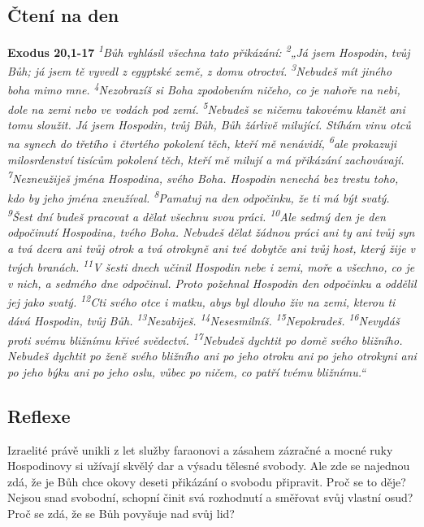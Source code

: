 \documentclass[11pt]{article}
\begin{document}
\subsection*{Čtení na den}
\textbf{Exodus 20,1-17}
\newline
\textit{
\textsuperscript{1}Bůh vyhlásil všechna tato přikázání:
\textsuperscript{2}„Já jsem Hospodin, tvůj Bůh; já jsem tě vyvedl z egyptské země, z domu otroctví.
\textsuperscript{3}Nebudeš mít jiného boha mimo mne.
\textsuperscript{4}Nezobrazíš si Boha zpodobením ničeho, co je nahoře na nebi, dole na zemi nebo ve vodách pod zemí.
\textsuperscript{5}Nebudeš se ničemu takovému klanět ani tomu sloužit. Já jsem Hospodin, tvůj Bůh, Bůh žárlivě milující. Stíhám vinu otců na synech do třetího i čtvrtého pokolení těch, kteří mě nenávidí,
\textsuperscript{6}ale prokazuji milosrdenství tisícům pokolení těch, kteří mě milují a má přikázání zachovávají.
\textsuperscript{7}Nezneužiješ jména Hospodina, svého Boha. Hospodin nenechá bez trestu toho, kdo by jeho jména zneužíval.
\textsuperscript{8}Pamatuj na den odpočinku, že ti má být svatý.
\textsuperscript{9}Šest dní budeš pracovat a dělat všechnu svou práci.
\textsuperscript{10}Ale sedmý den je den odpočinutí Hospodina, tvého Boha. Nebudeš dělat žádnou práci ani ty ani tvůj syn a tvá dcera ani tvůj otrok a tvá otrokyně ani tvé dobytče ani tvůj host, který žije v tvých branách.
\textsuperscript{11}V šesti dnech učinil Hospodin nebe i zemi, moře a všechno, co je v nich, a sedmého dne odpočinul. Proto požehnal Hospodin den odpočinku a oddělil jej jako svatý.
\textsuperscript{12}Cti svého otce i matku, abys byl dlouho živ na zemi, kterou ti dává Hospodin, tvůj Bůh.
\textsuperscript{13}Nezabiješ.
\textsuperscript{14}Nesesmilníš.
\textsuperscript{15}Nepokradeš.
\textsuperscript{16}Nevydáš proti svému bližnímu křivé svědectví.
\textsuperscript{17}Nebudeš dychtit po domě svého bližního. Nebudeš dychtit po ženě svého bližního ani po jeho otroku ani po jeho otrokyni ani po jeho býku ani po jeho oslu, vůbec po ničem, co patří tvému bližnímu.“
}

\subsection*{Reflexe}
Izraelité právě unikli z let služby faraonovi a zásahem zázračné a mocné ruky Hospodinovy si užívají skvělý
dar a výsadu tělesné svobody. Ale zde se najednou zdá, že je Bůh chce okovy deseti přikázání o svobodu
připravit. Proč se to děje? Nejsou snad svobodní, schopní činit svá rozhodnutí a směřovat svůj vlastní osud?
Proč se zdá, že se Bůh povyšuje nad svůj lid?
\end{document}
